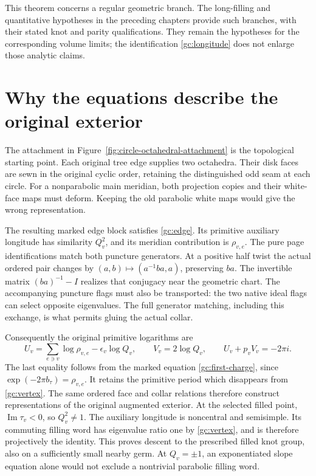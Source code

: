 This theorem concerns a regular geometric branch. The long-filling
and quantitative hypotheses in the preceding chapters provide such
branches, with their stated knot and parity qualifications. They
remain the hypotheses for the corresponding volume limits; the
identification \eqref{gc:longitude} does not enlarge those analytic
claims.

\section{Why the equations describe the original exterior}
\label{gc:actual-exterior}

The attachment in Figure~\ref{fig:circle-octahedral-attachment}
is the topological starting point. Each original tree edge supplies
two octahedra. Their disk faces are sewn in the original cyclic
order, retaining the distinguished odd seam at each circle.
For a nonparabolic main meridian, both projection copies and their
white-face maps must deform. Keeping the old parabolic white maps
would give the wrong representation.

The resulting marked edge block satisfies \eqref{gc:edge}.
Its primitive auxiliary longitude has similarity $Q_v^2$,
and its meridian contribution is $\rho_{v,e}$.
The pure page identifications match both puncture generators.
At a positive half twist the actual ordered pair changes by
$(a,b)\mapsto(a^{-1}ba,a)$, preserving $ba$.
The invertible matrix $(ba)^{-1}-I$ realizes that conjugacy
near the geometric chart. The accompanying puncture flags must
also be transported: the two native ideal flags can select
opposite eigenvalues. The full generator matching, including
this exchange, is what permits gluing the actual collar.

Consequently the original primitive logarithms are
\begin{equation}\label{gc:primitive}
 U_v=\sum_{e\ni v}\log\rho_{v,e}-\epsilon_v\log Q_v,
 \qquad V_v=2\log Q_v,\qquad U_v+p_vV_v=-2\pi i.
\end{equation}
The last equality follows from the marked equation
\eqref{gc:first-charge}, since
$\exp(-2\pi b_\tau)=\rho_{v,e}$.
It retains the primitive period which disappears from
\eqref{gc:vertex}. The same ordered face and collar relations therefore construct
representations of the original augmented exterior. At the selected
filled point, $\operatorname{Im}\tau_v<0$, so $Q_v^2\ne1$.
The auxiliary longitude is noncentral and semisimple. Its commuting
filling word has eigenvalue ratio one by \eqref{gc:vertex}, and is
therefore projectively the identity. This proves descent to the
prescribed filled knot group, also on a sufficiently small nearby
germ. At $Q_v=\pm1$, an exponentiated slope equation alone would
not exclude a nontrivial parabolic filling word.

